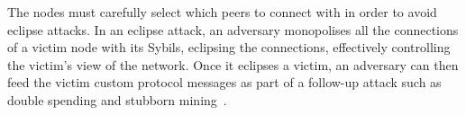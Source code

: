 The nodes must carefully select which peers to connect with in order to avoid eclipse attacks. In an eclipse attack, an adversary monopolises all the connections of a victim node with its Sybils, \ie eclipsing the connections, effectively controlling the victim's view of the network. Once it eclipses a victim, an adversary can then feed the victim custom protocol messages as part of a follow-up attack such as double spending and stubborn mining~\cite{henningsen2019eclipsing}.



%







